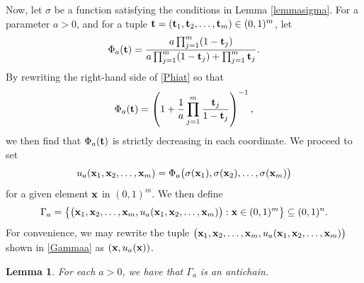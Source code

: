 \documentclass{publicadapt}
\newtheorem{lemma}{Lemma}%
\begin{document}
 Now, let $\sigma$ be a function satisfying the conditions in Lemma \ref{lemmasigma}. For a parameter $a > 0$, and for a tuple 
 $ \text{{\bf t}} = (\text{{\bf t}}_1, \text{{\bf t}}_2, \ldots, \text{{\bf t}}_m) \in (0, 1)^{m}$, let 
\begin{equation}\label{Phiat} 
 \Phi_{a}( \text{{\bf t}} ) = 
 \frac{a \prod_{j=1}^{m} (1 - \text{{\bf t}}_j)}{ a \prod_{j=1}^{m} (1 - \text{{\bf t}}_j) + \prod_{j=1}^{m} \text{{\bf t}}_j}.
\end{equation}
 By rewriting the right-hand side of \eqref{Phiat} so that 
 $$ \Phi_{a}(\text{{\bf t}}) = \left( 1 + \frac{1}{a} \prod_{j=1}^{m} \frac{\text{{\bf t}}_j}{1 - \text{{\bf t}}_{j}} \right)^{-1}, $$
 we then find that $\Phi_{a}(\text{{\bf t}})$ is strictly decreasing in each coordinate. 
 We proceed to set 
\begin{equation}\label{defineua}
 u_{a}(\text{{\bf x}}_1, \text{{\bf x}}_2, \ldots, \text{{\bf x}}_{m}) = 
 \Phi_{a}\big( \sigma(\text{{\bf x}}_{1}), \sigma(\text{{\bf x}}_{2}), \ldots, \sigma(\text{{\bf x}}_{m}) \big) 
\end{equation}
 for a given element $\text{{\bf x}}$ in $(0, 1)^{m}$.
 We then define
\begin{equation}\label{Gammaa}
 \Gamma_{a} = \left\{ \big( \text{{\bf x}}_1, \text{{\bf x}}_2, \ldots, \text{{\bf x}}_{m}, 
 u_{a}(\text{{\bf x}}_1, \text{{\bf x}}_2, \ldots, \text{{\bf x}}_{m}) \big) : \text{{\bf x}} \in (0, 1)^{m} \right\} 
 \subseteq (0, 1)^{n}. 
\end{equation}
 For convenience, we may rewrite the tuple $ \big( \text{{\bf x}}_1, \text{{\bf x}}_2, \ldots, \text{{\bf x}}_{m}, 
 u_{a}(\text{{\bf x}}_1, \text{{\bf x}}_2, \ldots, \text{{\bf x}}_{m}) \big) $ shown in 
 \eqref{Gammaa} as $(\text{{\bf x}}, u_{a}(\text{{\bf x}}))$. 

\begin{lemma}\label{oneantichain}%
 For each $a > 0$, we have that $\Gamma_a$ is an antichain. 
\end{lemma}
\end{document}
